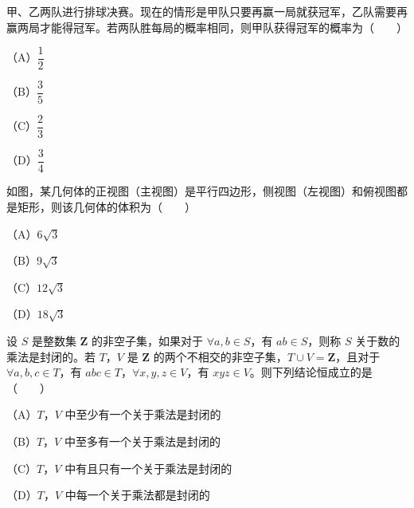 \begin{question}
甲、乙两队进行排球决赛。现在的情形是甲队只要再赢一局就获冠军，乙队需要再赢两局才能得冠军。若两队胜每局的概率相同，则甲队获得冠军的概率为\mbox{（　　）}

（A）$\dfrac12$

（B）$\dfrac35$

（C）$\dfrac23$

（D）$\dfrac34$

\Needspace{0.4\textheight}
\end{question}
\begin{question}
如图，某几何体的正视图（主视图）是平行四边形，侧视图（左视图）和俯视图都是矩形，则该几何体的体积为\mbox{（　　）}

（A）$6\sqrt3$

（B）$9\sqrt3$

（C）$12\sqrt3$

（D）$18\sqrt3$
\nopagebreak[4]
\begin{center}\end{center}
\nopagebreak[4]
\end{question}
\begin{question}
设 $S$ 是整数集 $\mathbf Z$ 的非空子集，如果对于 $\forall a,b\in S$，有 $ab\in S$，则称 $S$ 关于数的乘法是封闭的。若 $T$，$V$ 是 $\mathbf Z$ 的两个不相交的非空子集，$T\cup V=\mathbf Z$，且对于 $\forall a,b,c\in T$，有 $abc\in T$，$\forall x,y,z\in V$，有 $xyz\in V$。则下列结论恒成立的是\mbox{（　　）}

（A）$T$，$V$ 中至少有一个关于乘法是封闭的

（B）$T$，$V$ 中至多有一个关于乘法是封闭的

（C）$T$，$V$ 中有且只有一个关于乘法是封闭的

（D）$T$，$V$ 中每一个关于乘法都是封闭的

\end{question}

